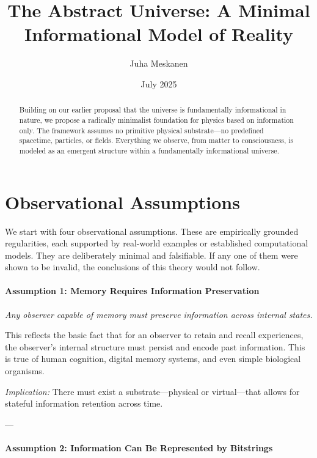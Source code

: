 \documentclass[12pt]{article}
\title{The Abstract Universe: A Minimal Informational Model of Reality}
\author{Juha Meskanen}
\date{July 2025}
\begin{document}
\maketitle

\begin{abstract}
    Building on our earlier proposal that the universe is fundamentally informational in nature,
    we propose a radically minimalist foundation for physics based on information only.
    The framework assumes no primitive physical substrate—no predefined spacetime, particles, or fields.
    Everything we observe, from matter to consciousness, is modeled as an emergent structure within a fundamentally informational universe.
\end{abstract}



\section{Observational Assumptions}

We start with four observational assumptions. These are empirically grounded regularities,
each supported by real-world examples or established computational models. They are deliberately
minimal and falsifiable. If any one of them were shown to be invalid, the conclusions of this theory would not follow.

\paragraph{Assumption 1: Memory Requires Information Preservation}

\emph{Any observer capable of memory must preserve information across internal states.}

\vspace{0.2em}
This reflects the basic fact that for an observer to retain and recall experiences, the observer's internal structure must persist and encode past information. This is true of human cognition, digital memory systems, and even simple biological organisms.

\emph{Implication:} There must exist a substrate—physical or virtual—that allows for stateful information retention across time.

---

\paragraph{Assumption 2: Information Can Be Represented by Bitstrings}
\end{document}
